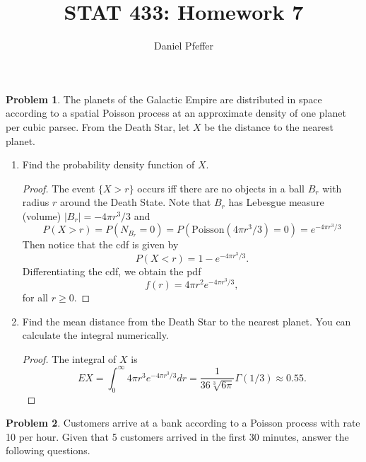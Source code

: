 \documentclass[oneside]{amsart}
\title{STAT 433: Homework 7}
\author{Daniel Pfeffer}
\newcommand{\Pois}{\mathrm{Poisson}}
\theoremstyle{definition}
\newtheorem{prob}{Problem}
\begin{document}
\maketitle

\begin{prob}
The planets of the Galactic Empire are distributed in space according to a spatial Poisson process at an approximate density of one planet per cubic parsec. From the Death Star, let $X$ be the distance to the nearest planet.
\end{prob}

\begin{enumerate}[label=(\alph*)]
\item
Find the probability density function of $X$.
\begin{proof}
The event $\{X > r\}$ occurs iff there are no objects in a ball $B_r$ with radius $r$ around the Death State. Note that $B_r$ has Lebesgue measure (volume) $|B_r| = -4 \pi r^3/3$ and 
\[
	P(X > r) = P(N_{B_r} = 0) = P(\Pois(4 \pi r^3/3) = 0) = e^{-4 \pi r^3/3}
\]
Then notice that the cdf is given by
\[
	P(X < r) = 1- e^{-4 \pi r^3/3}.
\]
Differentiating the cdf, we obtain the pdf 
\[
	f(r) = 4 \pi r^2 e^{-4 \pi r^3/3},
\]	
for all $r \geq 0$.
\end{proof}
\item
Find the mean distance from the Death Star to the nearest planet. You can calculate the integral numerically. 
\begin{proof}
The integral of $X$ is
\[
	E X=\int_0^\infty 4 \pi r^3 e^{-4 \pi r^3/3} dr = \frac{1}{36 \sqrt[3]{6 \pi}}\Gamma(1/3) \approx 0.55.
\]
\end{proof}
\end{enumerate}


\begin{prob}
Customers arrive at a bank according to a Poisson process with rate 10 per hour. Given that 5 customers arrived in the first 30 minutes, answer the following questions.
\end{prob}
\end{document}
